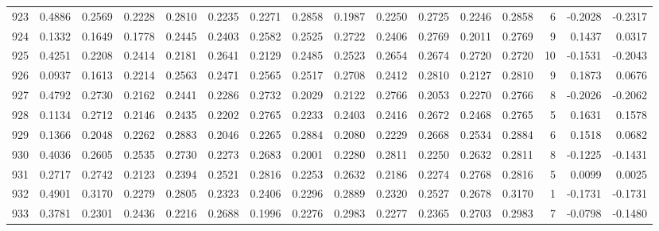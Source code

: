 \begin{tabular}{lrrrrrrrrrrrrrrr}
923 &      0.4886 &  0.2569 &  0.2228 &  0.2810 &  0.2235 &  0.2271 &  0.2858 &  0.1987 &  0.2250 &  0.2725 &   0.2246 &     0.2858 &      6 &                   -0.2028 &                    -0.2317 \\
924 &      0.1332 &  0.1649 &  0.1778 &  0.2445 &  0.2403 &  0.2582 &  0.2525 &  0.2722 &  0.2406 &  0.2769 &   0.2011 &     0.2769 &      9 &                    0.1437 &                     0.0317 \\
925 &      0.4251 &  0.2208 &  0.2414 &  0.2181 &  0.2641 &  0.2129 &  0.2485 &  0.2523 &  0.2654 &  0.2674 &   0.2720 &     0.2720 &     10 &                   -0.1531 &                    -0.2043 \\
926 &      0.0937 &  0.1613 &  0.2214 &  0.2563 &  0.2471 &  0.2565 &  0.2517 &  0.2708 &  0.2412 &  0.2810 &   0.2127 &     0.2810 &      9 &                    0.1873 &                     0.0676 \\
927 &      0.4792 &  0.2730 &  0.2162 &  0.2441 &  0.2286 &  0.2732 &  0.2029 &  0.2122 &  0.2766 &  0.2053 &   0.2270 &     0.2766 &      8 &                   -0.2026 &                    -0.2062 \\
928 &      0.1134 &  0.2712 &  0.2146 &  0.2435 &  0.2202 &  0.2765 &  0.2233 &  0.2403 &  0.2416 &  0.2672 &   0.2468 &     0.2765 &      5 &                    0.1631 &                     0.1578 \\
929 &      0.1366 &  0.2048 &  0.2262 &  0.2883 &  0.2046 &  0.2265 &  0.2884 &  0.2080 &  0.2229 &  0.2668 &   0.2534 &     0.2884 &      6 &                    0.1518 &                     0.0682 \\
930 &      0.4036 &  0.2605 &  0.2535 &  0.2730 &  0.2273 &  0.2683 &  0.2001 &  0.2280 &  0.2811 &  0.2250 &   0.2632 &     0.2811 &      8 &                   -0.1225 &                    -0.1431 \\
931 &      0.2717 &  0.2742 &  0.2123 &  0.2394 &  0.2521 &  0.2816 &  0.2253 &  0.2632 &  0.2186 &  0.2274 &   0.2768 &     0.2816 &      5 &                    0.0099 &                     0.0025 \\
932 &      0.4901 &  0.3170 &  0.2279 &  0.2805 &  0.2323 &  0.2406 &  0.2296 &  0.2889 &  0.2320 &  0.2527 &   0.2678 &     0.3170 &      1 &                   -0.1731 &                    -0.1731 \\
933 &      0.3781 &  0.2301 &  0.2436 &  0.2216 &  0.2688 &  0.1996 &  0.2276 &  0.2983 &  0.2277 &  0.2365 &   0.2703 &     0.2983 &      7 &                   -0.0798 &                    -0.1480 \\

\end{tabular}
